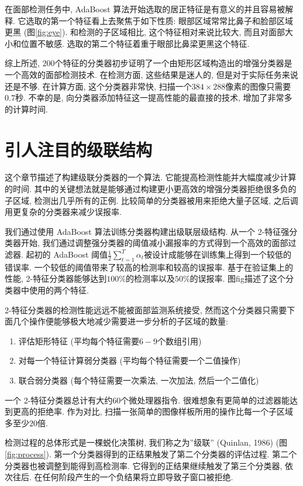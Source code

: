 \documentclass[a4paper,utf8,11pt, onecolumn]{ctexart}
\begin{document}
在面部检测任务中, AdaBoost 算法开始选取的居正特征是有意义的并且容易被解释. 它选取的第一个特征看上去聚焦于如下性质: 眼部区域常常比鼻子和脸部区域更黑 (图\ref{fig:eye}). 和检测的子区域相比, 这个特征相对来说比较大, 而且对面部大小和位置不敏感. 选取的第二个特征着重于眼部比鼻梁更黑这个特征.

综上所述, $200$个特征的分类器初步证明了一个由矩形区域构造出的增强分类器是一个高效的面部检测技术. 在检测方面, 这些结果是迷人的, 但是对于实际任务来说还是不够. 在计算方面, 这个分类器非常快, 扫描一个$384\times288$像素的图像只需要$0.7$秒. 不幸的是, 向分类器添加特征这一提高性能的最直接的技术, 增加了非常多的计算时间.

\section{引人注目的级联结构}\label{sec:cascade}
这个章节描述了构建级联分类器的一个算法. 它能提高检测性能并大幅度减少计算的时间. 其中的关键想法就是能够通过构建更小更高效的增强分类器拒绝很多负的子区域, 检测出几乎所有的正例. 比较简单的分类器被用来拒绝大量子区域, 之后调用更复杂的分类器来减少误报率.

我们通过使用 AdaBoost 算法训练分类器构建出级联层级结构. 从一个 2-特征强分类器开始, 我们通过调整强分类器的阈值减小漏报率的方式得到一个高效的面部过滤器. 起初的 AdaBoost 阈值$\frac12\sum_{t=1}^T\alpha_t$被设计成能够在训练集上得到一个较低的错误率. 一个较低的阈值带来了较高的检测率和较高的误报率. 基于在验证集上的性能, 2-特征分类器能够达到$100\%$的检测率以及$50\%$的误报率. 图fig描述了这个分类器中使用的两个特征.

2-特征分类器的检测性能远远不能被面部监测系统接受, 然而这个分类器只需要下面几个操作便能够极大地减少需要进一步分析的子区域的数量:
\begin{enumerate}
\item 评估矩形特征 (平均每个特征需要$6-9$个数组引用)
\item 对每一个特征计算弱分类器 (平均每个特征需要一个二值操作)
\item 联合弱分类器 (每个特征需要一次乘法, 一次加法, 然后一个二值化)
\end{enumerate}

一个 2-特征分类器总计有大约$60$个微处理器指令. 很难想象有更简单的过滤器能达到更高的拒绝率. 作为对比, 扫描一张简单的图像样板所用的操作比每一个子区域多至少$20$倍.

检测过程的总体形式是一棵蜕化决策树, 我们称之为''级联'' (Quinlan, 1986) (图\ref{fig:process}). 第一个分类器得到的正结果触发了第二个分类器的评估过程. 第二个分类器也被调整到能得到高检测率. 它得到的正结果继续触发了第三个分类器, 依次往后. 在任何阶段产生的一个负结果将立即导致子窗口被拒绝.
\end{document}
